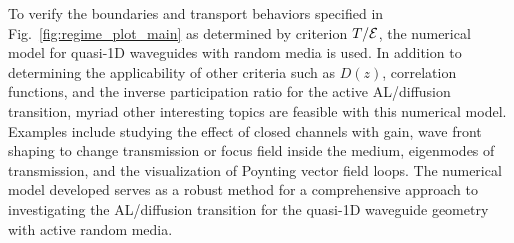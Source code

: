 To verify the boundaries and transport behaviors specified in Fig.~\ref{fig:regime_plot_main} as determined by criterion $T/{\cal E}$, the numerical model for quasi-1D waveguides with random media is used. In addition to determining the applicability of other criteria such as $D(z)$, correlation functions, and the inverse participation ratio for the active AL/diffusion transition, myriad other interesting topics are feasible with this numerical model. Examples include studying the effect of closed channels with gain\cite{2010_Payne_closed}, wave front shaping\cite{2008_Vellekoop_Mosk} to change transmission or focus field inside the medium, eigenmodes of transmission\cite{1986_Imry}, and the visualization of Poynting vector field loops. The numerical model developed serves as a robust method for a comprehensive approach to investigating the AL/diffusion transition for the quasi-1D waveguide geometry with active random media.


